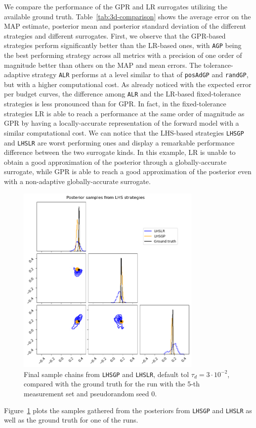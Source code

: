 We compare the performance of the GPR and LR surrogates utilizing the available ground truth.
Table~\ref{tab:3d-comparison} shows the average error on the MAP estimate, posterior mean and posterior standard deviation of the different strategies and different surrogates.
First, we observe that the GPR-based strategies perform significantly better than the LR-based ones, with \texttt{AGP} being the best performing strategy across all metrics with a precision of one order of magnitude better than others on the MAP and mean errors. 
The tolerance-adaptive strategy \texttt{ALR} performs at a level similar to that of \texttt{posAdGP} and \texttt{randGP}, but with a higher computational cost.
As already noticed with the expected error per budget curves, the difference among \texttt{ALR} and the LR-based fixed-tolerance strategies is less pronounced than for GPR.
In fact, in the fixed-tolerance strategies LR is able to reach a performance at the same order of magnitude as GPR by having a locally-accurate representation of the forward model with a similar computational cost.
We can notice that the LHS-based strategies \texttt{LHSGP} and \texttt{LHSLR} are worst performing ones and display a remarkable performance difference between the two surrogate kinds. 
In this example, LR is unable to obtain a good approximation of the posterior through a globally-accurate surrogate, while GPR is able to reach a good approximation of the posterior even with a non-adaptive globally-accurate surrogate.
\begin{figure}[t]
\begin{center}
    \includegraphics[width=0.8\textwidth]{results/pictures/d3/LHS_samples4_0.png}
\end{center}
\caption{Final sample chains from \texttt{LHSGP} and \texttt{LHSLR}, default tol $\tau_d = 3\cdot 10^{-2}$, compared with the ground truth for the run with the 5-th measurement set and pseudorandom seed 0.}
    \label{fig:3d-LHS}
\end{figure}
Figure~\ref{fig:3d-LHS} plots the samples gathered from the posteriors from \texttt{LHSGP} and \texttt{LHSLR} as well as the ground truth for one of the runs.




